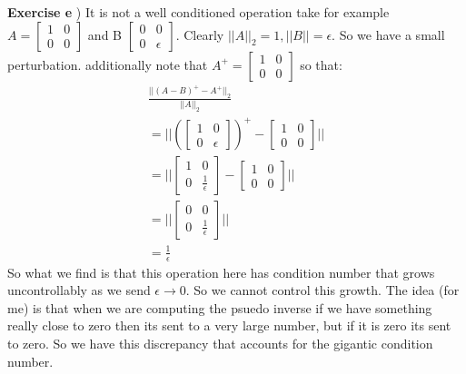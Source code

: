 \documentclass[12pt]{article}
\newenvironment{exercise}[1]{\vspace{.1in}\noindent\textbf{Exercise #1 \hspace{.05em}}}{}
\theoremstyle{definition}
\theoremstyle{remark}
\begin{document}
\begin{exercise}{5}
	e) It is not a well conditioned operation take for example $A= %
		\begin{bmatrix}
			1 & 0 \\
			0 & 0
		\end{bmatrix}$ and B $%
		\begin{bmatrix}
			0 & 0        \\
			0 & \epsilon
		\end{bmatrix}$. Clearly $||A||_2=1,||B||=\epsilon$. So we have a small perturbation. additionally note that $A^+=%
		\begin{bmatrix}
			1 & 0 \\
			0 & 0
		\end{bmatrix}$ so that:
	\begin{align}
		\frac{||(A-B)^+-A^+||_2}{||A||_2} \\
		=||(%
		\begin{bmatrix}
			1 & 0        \\
			0 & \epsilon
		\end{bmatrix})^+-%
		\begin{bmatrix}
			1 & 0 \\
			0 & 0
		\end{bmatrix}||                   \\
		=||%
		\begin{bmatrix}
			1 & 0                  \\
			0 & \frac{1}{\epsilon}
		\end{bmatrix}-%
		\begin{bmatrix}
			1 & 0 \\
			0 & 0
		\end{bmatrix}||                   \\
		=||%
		\begin{bmatrix}
			0 & 0                  \\
			0 & \frac{1}{\epsilon}
		\end{bmatrix}||            \\
		=\frac{1}{\epsilon}
	\end{align}
	So what we find is that this operation here has condition number that grows uncontrollably as we send $\epsilon\rightarrow 0$. So we cannot control this growth. The idea (for me) is that when we are computing the psuedo inverse if we have something really close to zero then its sent to a very large number, but if it is zero its sent to zero. So we have this discrepancy that accounts for the gigantic condition number.


\end{exercise}
\end{document}
